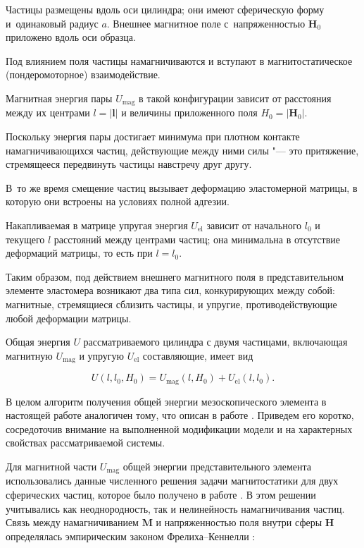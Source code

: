 Частицы размещены вдоль оси цилиндра; они имеют сферическую форму и~одинаковый радиус $a$. Внешнее магнитное поле с~напряженностью ${\boldsymbol H}_0$ приложено вдоль оси образца. 

Под влиянием поля частицы намагничиваются и вступают в магнитостатическое (пондеромоторное) взаимодействие.

Магнитная энергия пары $U_{\text{mag}}$ в такой конфигурации зависит от расстояния между их центрами $l=|{\boldsymbol l}|$ и величины приложенного поля $H_0=|{\boldsymbol H}_0|$.  

Поскольку энергия пары достигает минимума при плотном контакте намагничивающихся частиц, действующие между ними силы "--- это притяжение, стремящееся передвинуть частицы навстречу друг другу. 

В~то же время смещение частиц вызывает деформацию эластомерной матрицы, в которую они встроены на условиях полной адгезии. 

Накапливаемая в матрице упругая энергия $U_{\text{el}}$ зависит от начального $l_0$ и текущего $l$ расстояний между центрами частиц; она минимальна в отсутствие деформаций матрицы, то есть при $l=l_0$. 

Таким образом, под действием внешнего магнитного поля в представительном элементе эластомера возникают два типа сил, конкурирующих между собой: магнитные, стремящиеся сблизить частицы, и упругие, противодействующие любой деформации матрицы.



Общая энергия $U$ рассматриваемого цилиндра с двумя частицами, включающая магнитную $ U_{\text{mag}}$ и упругую $U_{\text{el}}$ составляющие, имеет вид

\begin{equation}

\label{eq:U}%

U(l,l_0,H_0) =  U_{\text{mag}}(l,H_0) + U_{\text{el}}(l,l_0).

\end{equation}

В целом алгоритм получения общей энергии мезоскопического элемента в настоящей работе аналогичен тому, что описан в работе \cite{VMSS_15}. Приведем его коротко, сосредоточив внимание на выполненной модификации модели и на характерных свойствах рассматриваемой системы.



Для магнитной части $U_{\text{mag}}$ общей энергии представительного элемента использовались данные численного решения задачи магнитостатики для двух сферических частиц, которое было получено в работе \cite{PRE_15}. В этом решении учитывались как неоднородность, так и нелинейность намагничивания частиц. Связь между намагничиванием $\boldsymbol M$ и напряженностью поля внутри сферы $\boldsymbol H$ определялась эмпирическим законом Фрелиха--Кеннелли \cite{Bozorth_93}:

